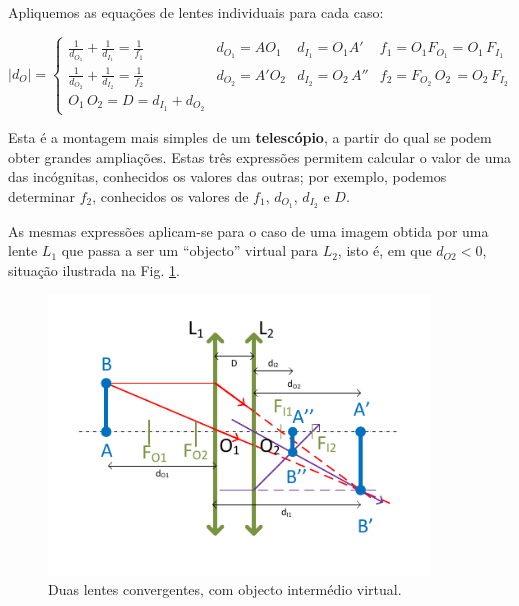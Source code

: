 \documentclass[a4paper,12pt]{article}      %
\begin{document}

Apliquemos as equações de lentes individuais para cada caso:

\begin{equation}
|d_O|  =  \left\{
\begin{array}{llll}
 \frac{1}{d_{O_1}} +  \frac{1}{d_{I_1}}   = \frac{1}{f_1}  & d_{O_1} = AO_1 & d_{I_1} = O_1A' & f_1 = O_1 F_{O_1} = O_1\,F_{I_1} \\
 \frac{1}{d_{O_2}} +  \frac{1}{d_{I_2}}   = \frac{1}{f_2}  & d_{O_2} = A'O_2 & d_{I_2} = O_2\,A'' & f_2 =  F_{O_2}\,O_2\, = O_2\,F_{I_2} \\
O_1\,O_2 = D = d_{I_1} + d_{O_2}
\end{array}  \right.
\label{eq:assoclentes_2}
\end{equation}

Esta é a montagem mais simples de um \textbf{telescópio}, a partir do qual se podem obter grandes ampliações.
Estas três expressões permitem calcular o valor de uma das incógnitas, conhecidos os valores das outras; por exemplo, podemos determinar $f_2$, conhecidos os valores de $f_1$, $d_{O_1}$, $d_{I_2}$ e $D$.

As mesmas expressões aplicam-se para o caso de uma imagem obtida por uma lente $L_1$ que passa a ser um “objecto” virtual para $L_2$, isto é, em que $d_{O2}<0$, situação ilustrada na Fig. \ref{fig:DuplaConvConv2}.

\begin{figure}	[!htb]  \centering 
	\includegraphics[width=0.9\textwidth]{10-DuplaConvConv2}
	\caption{Duas lentes convergentes, com objecto intermédio virtual. \label{fig:DuplaConvConv2}} 
\end{figure}
\end{document}
